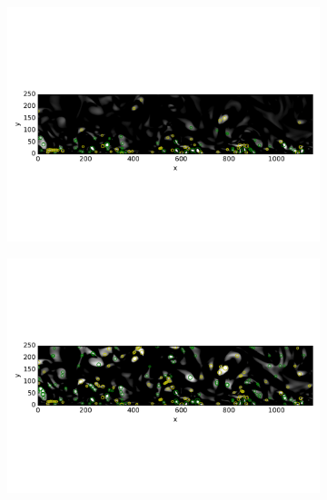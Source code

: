 \documentclass[12pt, a4paper, openany]{memoir}
\begin{document}
\begin{figure}[h!]
	\centering
	\begin{subfigure}[b]{\textwidth}
		\centering
	\includegraphics[trim=0 140 0 150 ,clip, width=\textwidth]{figure/PIVnonnormalized.pdf}
	\caption{}
	\label{fig:nonnorm2}
	\end{subfigure}
	\begin{subfigure}[b]{\textwidth}
		\centering
	\includegraphics[trim=0 140 0 150 , clip, width=\textwidth]{figure/PIVnormalized.pdf}
	\caption{}
	\label{fig:norm2}
	\end{subfigure}
	\begin{subfigure}[b]{\textwidth}
		\centering

\end{subfigure}
\end{figure}
\end{document}
